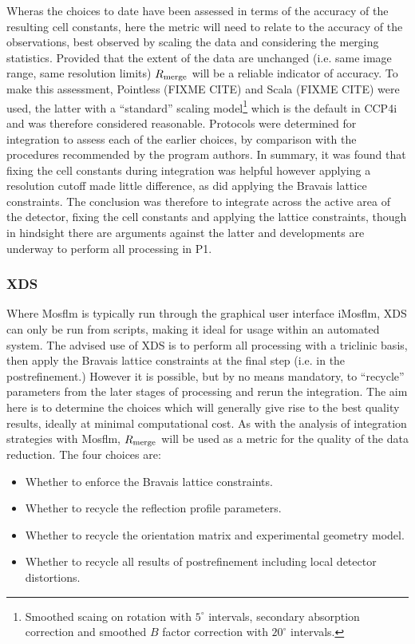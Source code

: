 \documentclass[preprint,pdf]{iucr}
\begin{document}
Wheras the choices to date have been assessed in terms of the accuracy
of the resulting cell constants, here the metric will need to relate
to the accuracy of the observations, best observed by scaling the data
and considering the merging statistics. Provided that the extent of
the data are unchanged (i.e. same image range, same resolution limits)
$R_{\rm{merge}}$ will be a reliable indicator of accuracy. To make
this assessment, Pointless (FIXME CITE) and Scala (FIXME CITE) were
used, the latter with a ``standard'' scaling model\footnote{Smoothed
  scaing on rotation with $5^{\circ}$ intervals, secondary absorption
  correction and smoothed $B$ factor correction with $20^{\circ}$
  intervals.}
which is the default in CCP4i and was therefore considered
reasonable. Protocols were determined for integration to assess each
of the earlier choices, by comparison with the procedures recommended
by the program authors. In summary, it was found that fixing the cell
constants during integration was helpful however applying a resolution
cutoff made little difference, as did applying the Bravais lattice
constraints. The conclusion was therefore to integrate across the
active area of the detector, fixing the cell constants and applying
the lattice constraints, though in hindsight there are arguments
against the latter and developments are underway to perform all
processing in P1.

\subsubsection{XDS}

Where Mosflm is typically run through the graphical user interface
iMosflm, XDS can only be run from scripts, making it ideal for usage
within an automated system. The advised use of XDS is to perform all
processing with a triclinic basis, then apply the Bravais lattice
constraints at the final step (i.e. in the postrefinement.) However it
is possible, but by no means mandatory, to ``recycle'' parameters from
the later stages of processing and rerun the integration. The aim here
is to determine the choices which will generally give rise to the best
quality results, ideally at minimal computational cost. As with the
analysis of integration strategies with Mosflm, $R_{\rm{merge}}$ will
be used as a metric for the quality of the data reduction. The four
choices are:

\begin{itemize}
\item{Whether to enforce the Bravais lattice constraints.}
\item{Whether to recycle the reflection profile parameters.}
\item{Whether to recycle the orientation matrix and experimental
    geometry model.}
\item{Whether to recycle all results of postrefinement including local
    detector distortions.}
\end{itemize}
\end{document}
